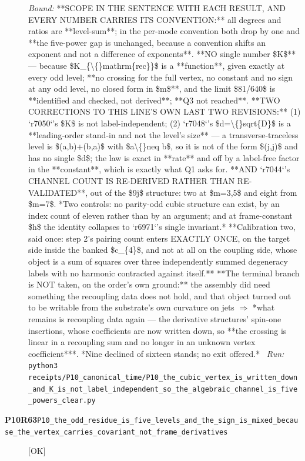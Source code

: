 \begin{description}
 \emph{Bound:}  **SCOPE IN THE SENTENCE WITH EACH RESULT, AND EVERY NUMBER CARRIES ITS CONVENTION:** all degrees and ratios are **level-sum**; in the per-mode convention both drop by one and **the five-power gap is unchanged, because a convention shifts an exponent and not a difference of exponents**.  **NO single number \$K\$** --- because \$K\_\{\textbackslash\{\}mathrm\{rec\}\}\$ is a **function**, given exactly at every odd level; **no crossing for the full vertex, no constant and no sign at any odd level, no closed form in \$m\$**, and the limit \$81/640\$ is **identified and checked, not derived**; **Q3 not reached**.  **TWO CORRECTIONS TO THIS LINE'S OWN LAST TWO REVISIONS:** (1) `r7050`'s \$K\$ is not label-independent; (2) `r7048`'s \$d=\textbackslash\{\}sqrt\{D\}\$ is a **leading-order stand-in and not the level's size** --- a transverse-traceless level is \$(a,b)+(b,a)\$ with \$a\textbackslash\{\}neq b\$, so it is not of the form \$(j,j)\$ and has no single \$d\$; the law is exact in **rate** and off by a label-free factor in the **constant**, which is exactly what Q1 asks for.  **AND `r7044`'s CHANNEL COUNT IS RE-DERIVED RATHER THAN RE-VALIDATED**, out of the \$9j\$ structure: two at \$m=3,5\$ and eight from \$m=7\$.  *Two controls: no parity-odd cubic structure can exist, by an index count of eleven rather than by an argument; and at frame-constant \$h\$ the identity collapses to `r6971`'s single invariant.*  **Calibration two, said once: step 2's pairing count enters EXACTLY ONCE, on the target side inside the banked \$c\_\{4\}\$, and not at all on the coupling side, whose object is a sum of squares over three independently summed degeneracy labels with no harmonic contracted against itself.**  **The terminal branch is NOT taken, on the order's own ground:** the assembly did need something the recoupling data does not hold, and that object turned out to be writable from the substrate's own curvature on jets \ensuremath{\Rightarrow} *what remains is recoupling data again --- the derivative structures' spin-one insertions, whose coefficients are now written down, so **the crossing is linear in a recoupling sum and no longer in an unknown vertex coefficient***.  *Nine declined of sixteen stands; no exit offered.*
\ \emph{Run:} \texttt{python3 receipts/P10\_canonical\_time/P10\_the\_cubic\_vertex\_is\_written\_down\_and\_K\_is\_not\_label\_independent\_so\_the\_algebraic\_channel\_is\_five\_powers\_clear.py}
\item[\rcptlabel{P10_the_odd_residue_is_five_levels_and_the_sign_is_mixed_because_the_vertex_carries_covariant_not_frame_derivatives}{P10R63}\textbf{P10R63}\quad\texttt{P10\_the\_odd\_residue\_is\_five\_levels\_and\_the\_sign\_is\_mixed\_because\_the\_vertex\_carries\_covariant\_not\_frame\_derivatives}]\hfill\textsf{[OK]}\\

\end{description}
